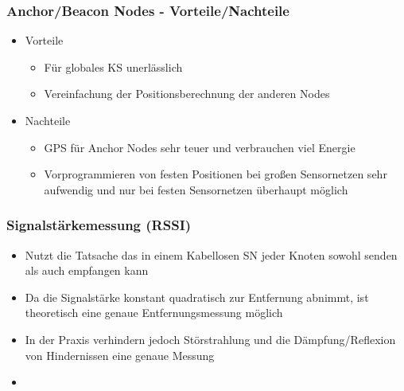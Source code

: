 \begin{frame}
\frametitle{Anchor/Beacon Nodes - Vorteile/Nachteile}

\begin{itemize}
  \item Vorteile
  \begin{itemize}
    \item Für globales KS unerlässlich
    \item Vereinfachung der Positionsberechnung der anderen Nodes
  \end{itemize}
  \item Nachteile
  \begin{itemize}
    \item GPS für Anchor Nodes sehr teuer und verbrauchen viel Energie
    \item Vorprogrammieren von festen Positionen bei großen
      Sensornetzen sehr aufwendig und nur bei festen Sensornetzen
      überhaupt möglich
  \end{itemize}
\end{itemize}
\end{frame}

\begin{frame}
\frametitle{Signalstärkemessung (RSSI)}

\begin{itemize}
  \item Nutzt die Tatsache das in einem Kabellosen SN jeder Knoten
    sowohl senden als auch empfangen kann
  \item Da die Signalstärke konstant quadratisch zur Entfernung
    abnimmt, ist theoretisch eine genaue Entfernungsmessung möglich
  \item In der Praxis verhindern jedoch Störstrahlung und die
    Dämpfung/Reflexion von Hindernissen eine genaue Messung
  \item 
\end{itemize}
\end{frame}

